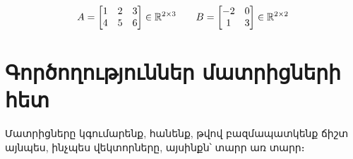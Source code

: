 \begin{example}
\[
  A = \begin{bmatrix}
    1 & 2 & 3 \\
    4 & 5 & 6 \\
  \end{bmatrix} \in \mathbb{R}^{2\times 3}
  \qquad
  B = \begin{bmatrix}
    -2 & 0 \\
    1 & 3 \\
  \end{bmatrix} \in \mathbb{R}^{2\times 2}
\]
\end{example}



 
\section{Գործողություններ մատրիցների հետ}

Մատրիցները կգումարենք, հանենք, թվով բազմապատկենք ճիշտ այնպես, ինչպես վեկտորները, այսինքն՝ տարր առ տարր։

